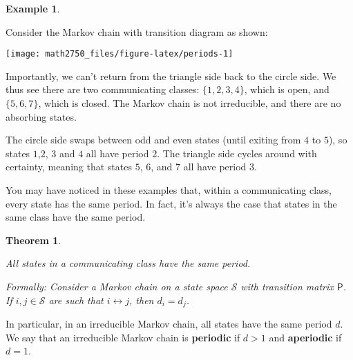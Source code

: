 \documentclass[
  a4paper,
]{article}
\newtheorem{theorem}{Theorem}[section]
\theoremstyle{definition}
\theoremstyle{definition}
\newtheorem{example}{Example}[section]
\theoremstyle{definition}
\theoremstyle{remark}
\begin{document}
\begin{example}
\protect\hypertarget{exm:weird-period}{}\label{exm:weird-period}

Consider the Markov chain with transition diagram as shown:

\begin{center}\texttt{[image: math2750\_files/figure-latex/periods-1]} \end{center}

Importantly, we can't return from the triangle side back to the circle side. We thus see there are two communicating classes: \(\{1,2,3,4\}\), which is open, and \(\{5,6,7\}\), which is closed. The Markov chain is not irreducible, and there are no absorbing states.

The circle side swaps between odd and even states (until exiting from \(4\) to \(5\)), so states \(1\),\(2\), \(3\) and \(4\) all have period \(2\). The triangle side cycles around with certainty, meaning that states \(5\), \(6\), and \(7\) all have period \(3\).

\end{example}

You may have noticed in these examples that, within a communicating class, every state has the same period. In fact, it's always the case that states in the same class have the same period.

\begin{theorem}
\protect\hypertarget{thm:class-period}{}\label{thm:class-period}

All states in a communicating class have the same period.

Formally: Consider a Markov chain on a state space \(\mathcal S\) with transition matrix \(\mathsf P\). If \(i,j\in\mathcal S\) are such that \(i \leftrightarrow j\), then \(d_i = d_j\).

\end{theorem}

In particular, in an irreducible Markov chain, all states have the same period \(d\). We say that an irreducible Markov chain is \textbf{periodic} if \(d>1\) and \textbf{aperiodic} if \(d=1\).
\end{document}
